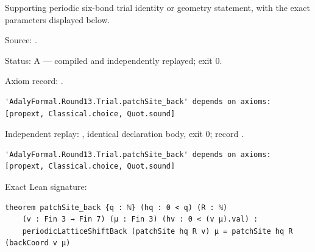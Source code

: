 \begin{theorem}[bp-378]
\label{bp-378}
\leanok
Supporting periodic six-bond trial identity or geometry statement, with the exact parameters displayed below.

\par Source: \texttt{}.
\par Status: A — compiled and independently replayed; exit 0.
\par Axiom record: \texttt{}.
\begin{verbatim}
'AdalyFormal.Round13.Trial.patchSite_back' depends on axioms: [propext, Classical.choice, Quot.sound]
\end{verbatim}
\par Independent replay: \texttt{}, identical declaration body, exit 0; record \texttt{}.
\begin{verbatim}
'AdalyFormal.Round13.Trial.patchSite_back' depends on axioms: [propext, Classical.choice, Quot.sound]
\end{verbatim}
\par Exact Lean signature:
\begin{verbatim}
theorem patchSite_back {q : ℕ} (hq : 0 < q) (R : ℕ)
    (v : Fin 3 → Fin 7) (μ : Fin 3) (hv : 0 < (v μ).val) :
    periodicLatticeShiftBack (patchSite hq R v) μ = patchSite hq R (backCoord v μ)
\end{verbatim}
\end{theorem}

